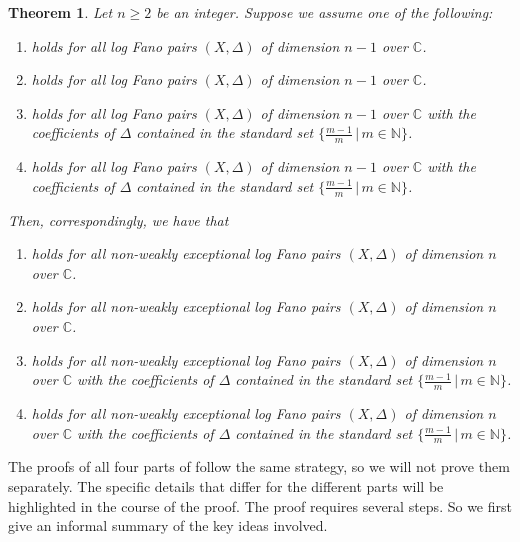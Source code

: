\documentclass[11pt,reqno]{amsart}
\newcommand{\C}{\mathbb{C}}
\newcommand{\N}{\mathbb{N}}
\numberwithin{equation}{section}
\newtheorem{thm}[prop] {Theorem}
\theoremstyle{definition}
\begin{document}
\begin{thm} \label{inductivethm}
Let $n \geq 2$ be an integer. Suppose we assume one of the following:
\begin{enumerate}
    \item {} holds for all log Fano pairs $(X, \Delta)$ of dimension $n-1$ over $\C$.
    \item {} holds for all log Fano pairs $(X, \Delta)$ of dimension $n-1$ over $\C$.
    \item {} holds for all log Fano pairs $(X, \Delta)$ of dimension $n-1$ over $\C$ with the coefficients of $\Delta$ contained in the standard set $\{ \frac{m-1}{m} \, | \, m \in \N \}$.
    \item {} holds for all log Fano pairs $(X, \Delta)$ of dimension $n-1$ over $\C$ with the coefficients of $\Delta$ contained in the standard set $\{ \frac{m-1}{m} \, | \, m \in \N \}$.
\end{enumerate}
Then, correspondingly, we have that
\begin{enumerate}
    \item {} holds for all non-weakly exceptional log Fano pairs $(X, \Delta)$ of dimension $n$ over $\C$.
    \item {} holds for all non-weakly exceptional log Fano pairs $(X, \Delta)$ of dimension $n$ over $\C$.
    \item {} holds for all non-weakly exceptional log Fano pairs $(X, \Delta)$ of dimension $n$ over $\C$ with the coefficients of $\Delta$ contained in the standard set $\{ \frac{m-1}{m} \, | \, m \in \N \}$.
    \item {} holds for all non-weakly exceptional log Fano pairs $(X, \Delta)$ of dimension $n$ over $\C$ with the coefficients of $\Delta$ contained in the standard set $\{ \frac{m-1}{m} \, | \, m \in \N \}$.
\end{enumerate}
\end{thm}

The proofs of all four parts of  follow the same strategy, so we will not prove them separately. The specific details that differ for the different parts will be highlighted in the course of the proof. The proof requires several steps. So we first give an informal summary of the key ideas involved. \\
\end{document}

